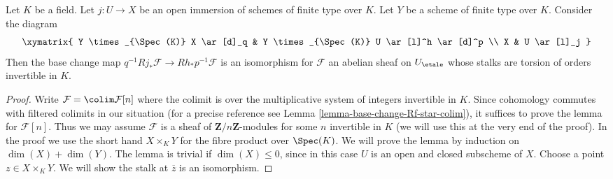 \begin{lemma}
\label{lemma-kunneth-localize-on-X}
Let $K$ be a field. Let $j : U \to X$ be an open immersion of
schemes of finite type over $K$. Let $Y$ be a scheme of finite type
over $K$. Consider the diagram
$$
\xymatrix{
Y \times_{\Spec(K)} X \ar[d]_q  &
Y \times_{\Spec(K)} U \ar[l]^h \ar[d]^p \\
X & U \ar[l]_j
}
$$
Then the base change map $q^{-1}Rj_*\mathcal{F} \to Rh_*p^{-1}\mathcal{F}$
is an isomorphism for $\mathcal{F}$ an abelian sheaf on $U_\etale$
whose stalks are torsion of orders invertible in $K$.
\end{lemma}

\begin{proof}
Write $\mathcal{F} = \colim \mathcal{F}[n]$ where the colimit
is over the multiplicative system of integers invertible in $K$.
Since cohomology commutes with filtered colimits in our situation
(for a precise reference see Lemma \ref{lemma-base-change-Rf-star-colim}),
it suffices to prove the lemma for $\mathcal{F}[n]$. Thus we may
assume $\mathcal{F}$ is a sheaf of $\mathbf{Z}/n\mathbf{Z}$-modules
for some $n$ invertible in $K$ (we will use this at the very end of
the proof). In the proof we use the short hand $X \times_K Y$ for the fibre
product over $\Spec(K)$.
We will prove the lemma by induction on $\dim(X) + \dim(Y)$.
The lemma is trivial if $\dim(X) \leq 0$, since in this case
$U$ is an open and closed subscheme of $X$.
Choose a point $z \in X \times_K Y$. We will show
the stalk at $\overline{z}$ is an isomorphism.


\end{proof}
